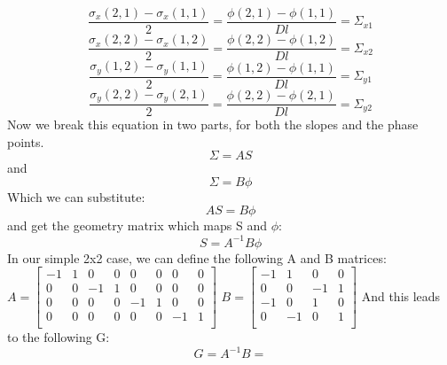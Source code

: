 \documentclass{article}
\begin{document}
$$ \frac{\sigma_x(2,1)-\sigma_x(1,1)}{2} = \frac{\phi(2,1)-\phi(1,1)}{Dl} = \varSigma_{x1}$$
$$ \frac{\sigma_x(2,2)-\sigma_x(1,2)}{2} = \frac{\phi(2,2)-\phi(1,2)}{Dl} = \varSigma_{x2}$$
$$ \frac{\sigma_y(1,2)-\sigma_y(1,1)}{2} = \frac{\phi(1,2)-\phi(1,1)}{Dl} = \varSigma_{y1}$$
$$ \frac{\sigma_y(2,2)-\sigma_y(2,1)}{2} = \frac{\phi(2,2)-\phi(2,1)}{Dl} = \varSigma_{y2}$$
Now we break this equation in two parts, for both the slopes and the phase points.
$$ \varSigma = AS$$
and
$$ \varSigma = B\phi$$ 
Which we can substitute:
$$ AS = B\phi $$
and get the geometry matrix which maps S and $\phi$:
$$ S = A^{-1}B\phi $$
In our simple 2x2 case, we can define the following A and B matrices:
\newline
\newline
$ A=
\begin{bmatrix}
-1 & 1 & 0 & 0 & 0 & 0 & 0 & 0  \\
 0 & 0 & -1& 1 & 0 & 0 & 0 & 0  \\
 0 & 0 & 0 & 0 & -1& 1 & 0 & 0  \\
 0 & 0 & 0 & 0 & 0 & 0 & -1& 1  \\
\end{bmatrix}
$
$
B = 
\begin{bmatrix}
-1 & 1 & 0 & 0 \\
 0 & 0 & -1& 1 \\
-1 & 0 & 1 & 0 \\
 0 & -1& 0 & 1 \\
\end{bmatrix}
$
\newline
\newline
And this leads to the following G:
$$
G = A^{-1}B = 
$$

\newpage
\end{document}
